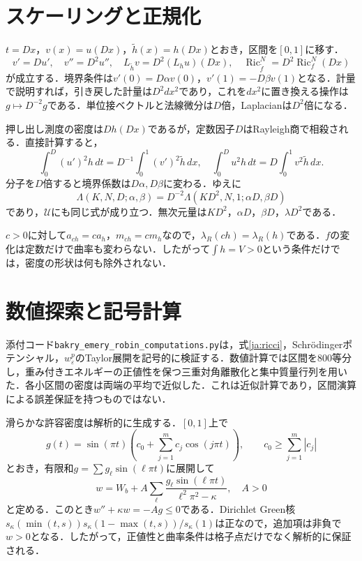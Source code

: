 \documentclass[12pt]{amsart}
\theoremstyle{definition}
\theoremstyle{remark}
\numberwithin{equation}{section}
\DeclareMathOperator{\Ric}{Ric}
\begin{document}
\section{スケーリングと正規化}
$t=Dx$，$v(x)=u(Dx)$，$\widetilde h(x)=h(Dx)$とおき，区間を$[0,1]$に移す．
\[
 v'=Du',\quad v''=D^2u'',\quad
 L_{\widetilde h}v=D^2(L_hu)(Dx),\quad
 \Ric_{\widetilde f}^N=D^2\Ric_f^N(Dx)
\]
が成立する．境界条件は$v'(0)=D\alpha v(0)$，$v'(1)=-D\beta v(1)$となる．計量で説明すれば，引き戻した計量は$D^2dx^2$であり，これを$dx^2$に置き換える操作は$g\mapsto D^{-2}g$である．単位接ベクトルと法線微分は$D$倍，Laplacianは$D^2$倍になる．

押し出し測度の密度は$Dh(Dx)$であるが，定数因子$D$はRayleigh商で相殺される．直接計算すると，
\[
 \int_0^D(u')^2h\,dt=D^{-1}\int_0^1(v')^2\widetilde h\,dx,
 \quad \int_0^D u^2h\,dt=D\int_0^1v^2\widetilde h\,dx.
\]
分子を$D$倍すると境界係数は$D\alpha,D\beta$に変わる．ゆえに
\begin{equation}\label{ja:scaling}
 \Lambda(K,N,D;\alpha,\beta)=D^{-2}\Lambda(KD^2,N,1;\alpha D,\beta D)
\end{equation}
であり，$\mathcal U$にも同じ式が成り立つ．無次元量は$KD^2$，$\alpha D$，$\beta D$，$\lambda D^2$である．

$c>0$に対して$a_{ch}=ca_h$，$m_{ch}=cm_h$なので，$\lambda_R(ch)=\lambda_R(h)$である．$f$の変化は定数だけで曲率も変わらない．したがって$\int h=V>0$という条件だけでは，密度の形状は何も除外されない．

\section{数値探索と記号計算}
添付コード\texttt{bakry\_emery\_robin\_\allowbreak computations.py}は，式\eqref{ja:ricci}，Schr\"odingerポテンシャル，$w_\varepsilon^p$のTaylor展開を記号的に検証する．数値計算では区間を800等分し，重み付きエネルギーの正値性を保つ三重対角離散化と集中質量行列を用いた．各小区間の密度は両端の平均で近似した．これは近似計算であり，区間演算による誤差保証を持つものではない．

滑らかな許容密度は解析的に生成する．$[0,1]$上で
\[
 g(t)=\sin(\pi t)\left(c_0+\sum_{j=1}^m c_j\cos(j\pi t)\right),
 \qquad c_0\ge\sum_{j=1}^m|c_j|
\]
とおき，有限和$g=\sum g_\ell\sin(\ell\pi t)$に展開して
\[
 w=W_b+A\sum_{\ell}\frac{g_\ell\sin(\ell\pi t)}{\ell^2\pi^2-\kappa},\quad A>0
\]
と定める．このとき$w''+\kappa w=-Ag\le0$である．Dirichlet Green核
$s_\kappa(\min(t,s))s_\kappa(1-\max(t,s))/s_\kappa(1)$は正なので，追加項は非負で$w>0$となる．したがって，正値性と曲率条件は格子点だけでなく解析的に保証される．
\end{document}
